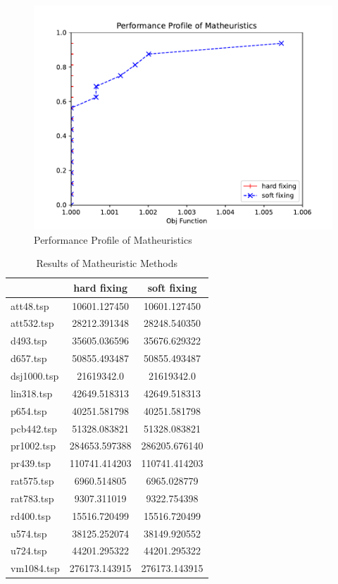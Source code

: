 \begin{figure}[!h]
    \centering
    \includegraphics[width=\textwidth]{images/hs.pdf}
    \caption{Performance Profile of Matheuristics}
    \label{fig:hs}
\end{figure}

\begin{table}[!h]
    \centering
    \begin{tabular}{lcc}
    \cline{2-3}
                & \textbf{hard fixing} & \textbf{soft fixing} \\ \hline
    att48.tsp   & 10601.127450         & 10601.127450         \\
    att532.tsp  & 28212.391348         & 28248.540350         \\
    d493.tsp    & 35605.036596         & 35676.629322         \\
    d657.tsp    & 50855.493487         & 50855.493487         \\
    dsj1000.tsp & 21619342.0      & 21619342.0      \\
    lin318.tsp  & 42649.518313         & 42649.518313         \\
    p654.tsp    & 40251.581798         & 40251.581798         \\
    pcb442.tsp  & 51328.083821         & 51328.083821         \\
    pr1002.tsp  & 284653.597388        & 286205.676140        \\
    pr439.tsp   & 110741.414203        & 110741.414203        \\
    rat575.tsp  & 6960.514805          & 6965.028779          \\
    rat783.tsp  & 9307.311019          & 9322.754398          \\
    rd400.tsp   & 15516.720499         & 15516.720499         \\
    u574.tsp    & 38125.252074         & 38149.920552         \\
    u724.tsp    & 44201.295322         & 44201.295322         \\
    vm1084.tsp  & 276173.143915        & 276173.143915        \\ \hline
    \end{tabular}
    \caption{Results of Matheuristic Methods}
    \label{table:math}
    \end{table}